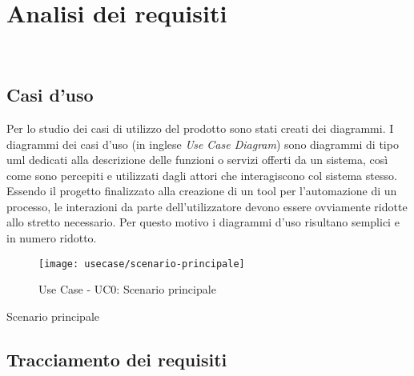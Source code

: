 
\chapter{Analisi dei requisiti}
\label{cap:analisi-requisiti}

\\

\section{Casi d'uso}

Per lo studio dei casi di utilizzo del prodotto sono stati creati dei diagrammi.
I diagrammi dei casi d'uso (in inglese \emph{Use Case Diagram}) sono diagrammi di tipo \gls{uml} dedicati alla descrizione delle funzioni o servizi offerti da un sistema, così come sono percepiti e utilizzati dagli attori che interagiscono col sistema stesso.\\
Essendo il progetto finalizzato alla creazione di un tool per l'automazione di un processo, le interazioni da parte dell'utilizzatore devono essere ovviamente ridotte allo stretto necessario. Per questo motivo i diagrammi d'uso risultano semplici e in numero ridotto.

\begin{figure}[!h] 
    \centering 
    \texttt{[image: usecase/scenario-principale]} 
    \caption{Use Case - UC0: Scenario principale}
\end{figure}

\begin{usecase}{0}{Scenario principale}
\label{uc:scenario-principale}
\end{usecase}

\section{Tracciamento dei requisiti}

